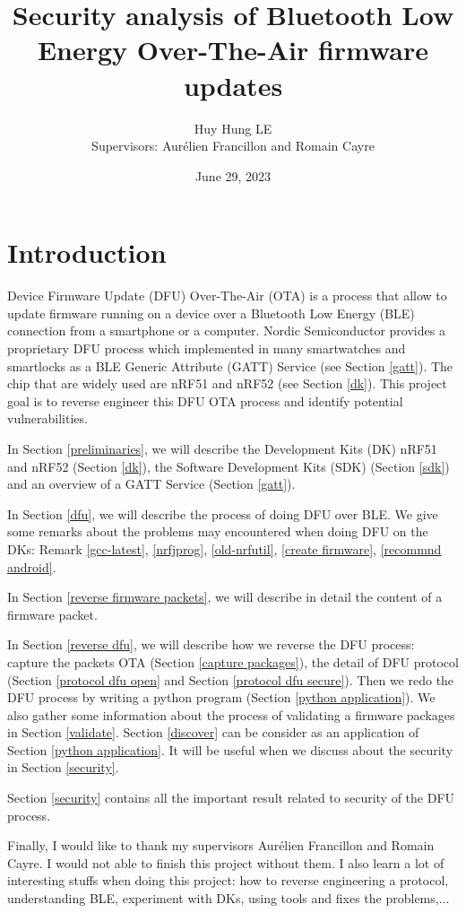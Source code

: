 \documentclass{article}
\title{Security analysis of Bluetooth Low Energy Over-The-Air firmware updates}
\author{Huy Hung LE\\[0.5cm]{\small Supervisors: Aur\'elien Francillon and Romain Cayre}}
\date{June 29, 2023}
\theoremstyle{plain}
\theoremstyle{definition}
\numberwithin{equation}{section}
\begin{document}
\maketitle
\tableofcontents

\section*{Introduction}

Device Firmware Update (DFU)  Over-The-Air (OTA) is a process that allow to update firmware running on a device over a Bluetooth Low Energy (BLE) connection from a smartphone or a computer. Nordic Semiconductor provides a proprietary DFU process which implemented in many smartwatches and smartlocks as a BLE Generic Attribute (GATT) Service (see Section \ref{gatt}). The chip that are widely used are nRF51 and nRF52 (see Section \ref{dk}). This project goal is to reverse engineer this DFU OTA process and identify potential vulnerabilities.

In Section \ref{preliminaries}, we will describe the Development Kits (DK) nRF51 and nRF52 (Section \ref{dk}), the Software Development Kits (SDK) (Section \ref{sdk}) and an overview of a GATT Service (Section \ref{gatt}).

In Section \ref{dfu}, we will describe the process of doing DFU over BLE. We give some remarks about the problems may encountered when doing DFU on the DKs: Remark \ref{gcc-latest}, \ref{nrfjprog}, \ref{old-nrfutil}, \ref{create firmware}, \ref{recommnd android}.

In Section \ref{reverse firmware packets}, we will describe in detail the content of a firmware packet.

In Section \ref{reverse dfu}, we will describe how we reverse the DFU process: capture the packets OTA (Section \ref{capture packages}), the detail of DFU protocol (Section \ref{protocol dfu open} and Section \ref{protocol dfu secure}). Then we redo the DFU process by writing a python program (Section \ref{python application}). We also gather some information about the process of validating a firmware packages in Section \ref{validate}. Section \ref{discover} can be consider as an application of Section \ref{python application}. It will be useful when we discuss about the security in Section \ref{security}.

Section \ref{security} contains all the important result related to security of the DFU process.

Finally, I would like to thank my supervisors Aur\'elien Francillon and Romain Cayre. I would not able to finish this project without them. I also learn a lot of interesting stuffs when doing this project: how to reverse engineering a protocol, understanding BLE, experiment with DKs, using tools and fixes the problems,...
\end{document}
